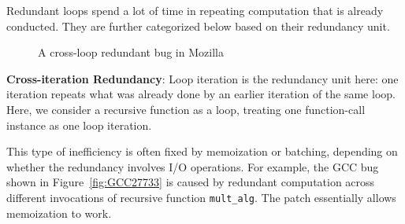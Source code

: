 Redundant loops spend a lot of time in repeating computation that is already
conducted. They are further categorized below based on their redundancy unit.



\begin{figure}
\centering
{}
  \mbox{}
\vspace{-0.05in}
\caption{A cross-loop redundant bug in Mozilla }
\label{fig:Mozilla477564}
\end{figure}


{\textbf{Cross-iteration Redundancy}}:
Loop iteration is the redundancy unit here:
one iteration repeats
what was already done by an earlier iteration of the same loop.
Here, we consider a recursive function as a loop, treating one function-call
instance as one loop iteration. 

This type of inefficiency is often fixed by memoization or batching, depending
on whether the redundancy involves I/O operations.
For example, the GCC bug shown in Figure~\ref{fig:GCC27733} is caused by
redundant computation across different invocations of recursive function
\texttt{mult\_alg}. The patch essentially allows memoization to work.

